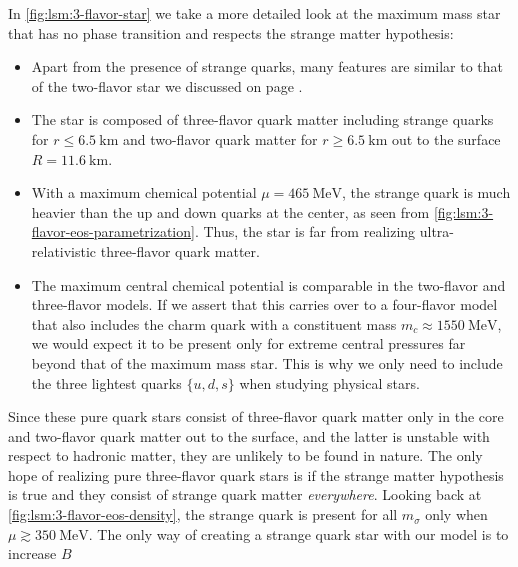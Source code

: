 In \cref{fig:lsm:3-flavor-star} we take a more detailed look at the maximum mass star that has no phase transition and respects the strange matter hypothesis:
\begin{itemize}
\item Apart from the presence of strange quarks, many features are similar to that of the two-flavor star we discussed on page \pageref{list:lsm:2-flavor-star-discussion}.
\item The star is composed of three-flavor quark matter including strange quarks for $r \leq \SI{6.5}{\kilo\meter}$
      and two-flavor quark matter for $r \geq \SI{6.5}{\kilo\meter}$ out to the surface $R=\SI{11.6}{\kilo\meter}$.
\item With a maximum chemical potential $\mu=\SI{465}{\mega\electronvolt}$, the strange quark is much heavier than the up and down quarks at the center, as seen from \cref{fig:lsm:3-flavor-eos-parametrization}.
      Thus, the star is far from realizing ultra-relativistic three-flavor quark matter.
\item The maximum central chemical potential is comparable in the two-flavor and three-flavor models.
      If we assert that this carries over to a four-flavor model that also includes the charm quark with a constituent mass $m_c \approx \SI{1550}{\mega\electronvolt}$,
      we would expect it to be present only for extreme central pressures far beyond that of the maximum mass star.
      This is why we only need to include the three lightest quarks $\{u,d,s\}$ when studying physical stars.
\end{itemize}
Since these pure quark stars consist of three-flavor quark matter only in the core
and two-flavor quark matter out to the surface,
and the latter is unstable with respect to hadronic matter,
they are unlikely to be found in nature.
The only hope of realizing pure three-flavor quark stars is
if the strange matter hypothesis is true and they consist of strange quark matter \emph{everywhere}.
Looking back at \cref{fig:lsm:3-flavor-eos-density}, the strange quark is present for all $m_\sigma$ only when $\mu \gtrsim \SI{350}{\mega\electronvolt}$.
The only way of creating a strange quark star with our model is to increase $B$
